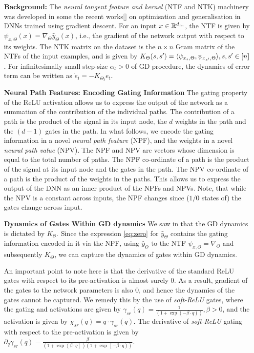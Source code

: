 \documentclass{article}
\begin{document}
\textbf{Background:} The \emph{neural tangent feature and kernel} (NTF and NTK) machinery was developed in some the recent works[] on optimisation and generalisation in DNNs trained using gradient descent. For an input $x\in\mathbb{R}^{d_{in}}$, the NTF is given by $\psi_{x,\Theta}(x)=\nabla_{\Theta}\hat{y}_{\Theta}(x)$, i.e.,  the gradient of the network output with respect to its weights. The NTK matrix on the dataset is the $n\times n$ Gram matrix of the NTFs of the input examples, and is given by $K_{\Theta}(s,s')=\langle \psi_{x_s,\Theta},\psi_{x_{s'},\Theta}\rangle, s,s'\in[n]$. For infinitesimally small step-size $\alpha_t>0$ of GD procedure, the dynamics of error term can be written as $\dot{e}_t=-K_{\Theta_t} e_t$. 

\textbf{Neural Path Features: Encoding Gating Information} The gating property of the ReLU activation allows us to express the output of the network as a summation of the contribution of the individual paths. The contribution of a path is the product of the signal in its input node, the $d$ weights in the path and the $(d-1)$ gates in the path. In what follows, we encode the gating information in a novel \emph{neural path feature} (NPF), and the weights in a novel \emph{neural path value} (NPV). The NPF and NPV are vectors whose dimension is equal to the total number of paths. The NPF co-ordinate of a path is the product of the signal at its input node and the gates in the path. The NPV co-ordinate of a path is the product of the weights in the paths. This allows us to express the output of the DNN as an inner product of the NPFs and NPVs. Note, that while the NPV is a constant across inputs, the NPF changes since ($1/0$ states of) the gates change across input. 

\textbf{Dynamics of Gates Within GD dynamics} We saw in  that the GD dynamics is dictated by $K_{\Theta}$. Since the expression \eqref{eq:zero} for $\hat{y}_{\Theta}$ contains the gating information encoded in it via the NPF, using $\hat{y}_{\Theta}$ to the NTF $\psi_{x,\Theta}=\nabla_{\Theta}$ and subsequently $K_{\Theta}$, we can capture the dynamics of gates within GD dynamics. 

An important point to note here is that the derivative of the standard ReLU gates with respect to its pre-activation is almost surely $0$. As a result, gradient of the gates to the network parameters is also $0$, and hence the dynamics of the gates cannot be captured. We remedy this by the use of \emph{soft-ReLU} gates, where the gating and activations are given by $\gamma_{sr}(q)=\frac{1}{\left(1+\exp(-\beta \cdot q)\right)}, \beta>0$, and the activation is given by $\chi_{sr}(q)=q\cdot \gamma_{sr}(q)$. The derivative of \emph{soft-ReLU} gating with respect to the pre-activation is given by $\partial_{q}\gamma_{sr}(q)=\frac{\beta}{\left(1+\exp(\beta\cdot q)\right)\left(1+\exp(-\beta\cdot q)\right)}$.
\end{document}

